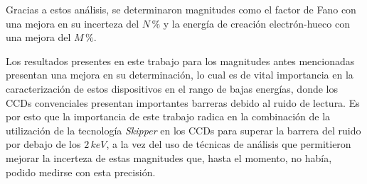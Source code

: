 Gracias a estos análisis, se determinaron magnitudes como el factor de Fano con una mejora en su incerteza del $N\,\%$ y la energía de creación electrón-hueco con una mejora del $M\,\%$.

Los resultados presentes en este trabajo para los magnitudes antes mencionadas presentan una mejora en su determinación, lo cual es de vital importancia en la caracterización de estos dispositivos en el rango de bajas energías, donde los CCDs convenciales presentan importantes barreras debido al ruido de lectura. Es por esto que la importancia de este trabajo radica en la combinación de la utilización de la tecnología \textit{Skipper} en los CCDs para superar la barrera del ruido por debajo de los $2\,\si{keV}$, a la vez del uso de técnicas de análisis que permitieron mejorar la incerteza de estas magnitudes que, hasta el momento, no había, podido medirse con esta precisión.



\newpage
\thispagestyle{empty} \mbox{}
\thispagestyle{empty}
